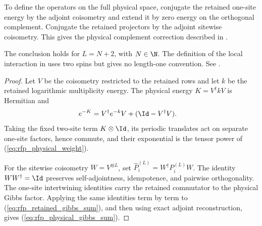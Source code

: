 \begin{lemma}
    To define the operators on the full physical space, conjugate the retained
    one-site energy by the adjoint coisometry and extend it by zero
    energy on the orthogonal complement. Conjugate the retained projectors
    by the adjoint sitewise coisometry. This gives the physical
    complement correction described in
    \cite{gap:cpsv16_topological_gibbs_physical_complement}.

    The conclusion holds for $L=N+2$, with $N\in\N$. The definition of the
    local interaction in \cite{Cirac2016MPDO_arXiv} uses two spins but gives
    no length-one convention. See
    \cite{gap:cpsv16_topological_gibbs_length_one}.
\end{lemma}
\begin{proof}\leanok
    Let $V$ be the coisometry restricted to the retained rows and let $k$ be
    the retained logarithmic multiplicity energy. The physical energy
    $K=V^\dagger kV$ is Hermitian and
    \begin{align}
        e^{-K}
         & =V^\dagger e^{-k}V+(\Id-V^\dagger V).
        \label{eq:rfp_physical_weight}
    \end{align}
    Taking the fixed two-site term $K\otimes\Id$, its periodic translates act
    on separate one-site factors, hence commute, and their exponential is the
    tensor power of (\ref{eq:rfp_physical_weight}).

    For the sitewise coisometry $W=V^{\otimes L}$, set
    $\widehat P_i^{(L)}=W^\dagger P_i^{(L)}W$. The identity
    $WW^\dagger=\Id$ preserves self-adjointness, idempotence, and pairwise
    orthogonality. The one-site intertwining identities carry the
    retained commutator to the physical Gibbs factor. Applying the same
    identities term by term to (\ref{eq:rfp_retained_gibbs_sum}), and then
    using exact adjoint reconstruction, gives
    (\ref{eq:rfp_physical_gibbs_sum}).
\end{proof}

